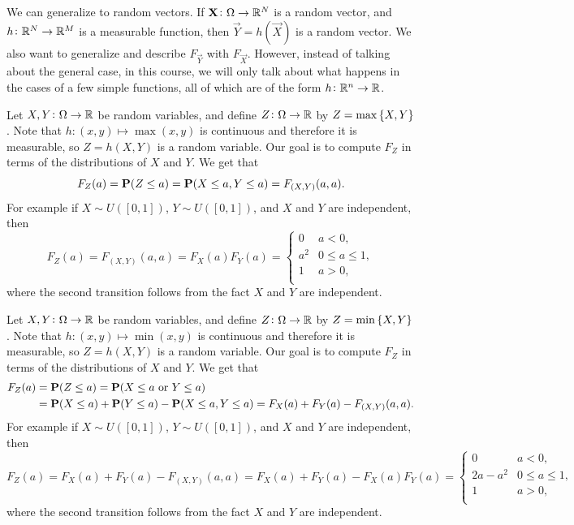 \documentclass[11pt,a4paper]{article}
\begin{document}
\begin{remark}
  We can generalize 
  to random vectors.
  If $\boldsymbol{\mathbf{X}} \colon \Omega \to \mathbb{R}^N$ is a random vector,
  and $h \colon \mathbb{R}^N \to \mathbb{R}^M$ is a measurable function,
  then $\vec Y = h(\vec X)$ is a random vector.
  We also want to generalize 
  and describe $F_{\vec Y}$ with $F_{\vec X}$.
  However, instead of talking about the general case,
  in this course, we will only talk about what happens
  in the cases of a few simple functions,
  all of which are of the form $h \colon \mathbb{R}^n \to \mathbb{R}$.
\end{remark}

\begin{example}
  Let $X,Y \colon \Omega \to \mathbb{R}$ be random variables,
  and define $Z \colon \Omega \to \mathbb{R}$ by $Z = \max\left\{X,Y\right\}$.
  Note that $h \colon (x,y) \mapsto \max(x,y)$ is continuous
  and therefore it is measurable, so $Z = h(X,Y)$ is a random variable.
  Our goal is to compute $F_Z$ in terms of the distributions of $X$
  and $Y$.
  We get that
  \[
    F_{Z}(a) =
    \mathbf{P}(Z \le a) =
    \mathbf{P}(X \le a, Y \le a) =
    F_{(X,Y)}(a,a).
  \]
  For example if $X \sim U([0,1])$, $Y \sim U([0,1])$,
  and $X$ and $Y$ are independent,
  then
  \[
    F_{Z}(a) =
    F_{(X,Y)}(a,a) =
    F_X(a) F_Y(a) =
    \begin{cases}
      0 &a < 0, \\
      a^2 &0 \le a \le 1, \\
      1 &a > 0, \\
    \end{cases}
  \]
  where the second transition follows from the fact $X$ and $Y$
  are independent.
\end{example}

\begin{example}
  Let $X,Y \colon \Omega \to \mathbb{R}$ be random variables,
  and define $Z \colon \Omega \to \mathbb{R}$ by $Z = \min\left\{X,Y\right\}$.
  Note that $h \colon (x,y) \mapsto \min(x,y)$ is continuous
  and therefore it is measurable, so $Z = h(X,Y)$ is a random variable.
  Our goal is to compute $F_Z$ in terms of the distributions of $X$
  and $Y$.
  We get that
  \begin{align*}
    F_{Z}(a) &=
    \mathbf{P}(Z \le a) =
    \mathbf{P}(X \le a \text{ or } Y \le a) \\ &=
    \mathbf{P}(X \le a) + \mathbf{P}(Y \le a) - \mathbf{P}(X \le a, Y \le a) =
    F_X(a) + F_Y(a) - F_{(X,Y)}(a,a).
  \end{align*}
  For example if $X \sim U([0,1])$, $Y \sim U([0,1])$,
  and $X$ and $Y$ are independent,
  then
  \[
    F_{Z}(a) =
    F_X(a) + F_Y(a) - F_{(X,Y)}(a,a) =
    F_X(a) + F_Y(a) - F_X(a) F_Y(a) =
    \begin{cases}
      0 &a < 0, \\
      2a - a^2 &0 \le a \le 1, \\
      1 &a > 0, \\
    \end{cases}
  \]
  where the second transition follows from the fact $X$ and $Y$
  are independent.
\end{example}
\end{document}
